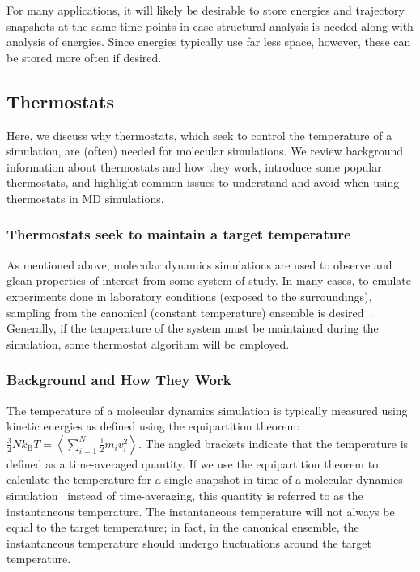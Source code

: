 \documentclass[9pt,bestpractices]{livecoms}
\begin{document}
For many applications, it will likely be desirable to store energies and trajectory snapshots at the same time points in case structural analysis is needed along with analysis of energies.
Since energies typically use far less space, however, these can be stored more often if desired.

\subsection{Thermostats}
\label{sec:thermostats}

Here, we discuss why thermostats, which seek to control the temperature of a simulation, are (often) needed for molecular simulations. 
We review background information about thermostats and how they work, introduce some popular thermostats, and highlight common issues to understand and avoid when using thermostats in MD simulations.

\subsubsection{Thermostats seek to maintain a target temperature}
As mentioned above, molecular dynamics simulations are used to observe and glean properties of interest from some system of study.
In many cases, to emulate experiments done in laboratory conditions (exposed to the surroundings), sampling from the canonical (constant temperature) ensemble is desired~\cite{thermostatAlgorithms2005}.
Generally, if the temperature of the system must be maintained during the simulation, some thermostat algorithm will be employed. 


\subsubsection{Background and How They Work}

The temperature of a molecular dynamics simulation is typically measured using kinetic energies as defined using the equipartition theorem: $\frac{3}{2} N k_{\text{B}} T = \left<\sum_{i=1}^{N} \frac{1}{2} m_i v_i^2\right>$.
The angled brackets indicate that the temperature is defined as a time-averaged quantity.
If we use the equipartition theorem to calculate the temperature for a single snapshot in time of a molecular dynamics simulation~\cite{Zuckerman:2010:, LeachBook} instead of time-averaging, this quantity is referred to as the instantaneous temperature.
The instantaneous temperature will not always be equal to the target temperature; in fact, in the canonical ensemble, the instantaneous temperature should undergo fluctuations around the target temperature.
\end{document}
